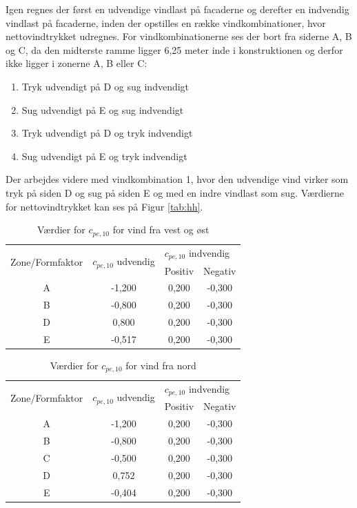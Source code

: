 Igen regnes der først en udvendige vindlast på facaderne og derefter en indvendig vindlast på facaderne, inden der opstilles en række vindkombinationer, hvor nettovindtrykket udregnes. For vindkombinationerne ses der bort fra siderne A, B og C, da den midterste ramme ligger 6,25 meter inde i konstruktionen og derfor ikke ligger i zonerne A, B eller C:
\begin{enumerate}
	\item Tryk udvendigt på D og sug indvendigt
	\item Sug udvendigt på E og sug indvendigt
	\item Tryk udvendigt på D og tryk indvendigt  
	\item Sug udvendigt på E og tryk indvendigt
\end{enumerate}

Der arbejdes videre med vindkombination 1, hvor den udvendige vind virker som tryk på siden D og sug på siden E og med en indre vindlast som sug.
\newline \indent{     }  Værdierne for nettovindtrykket kan ses på Figur \ref{tab:hh}.

\begin{table}[htb]
	\begin{center}
		\begin{tabular}{ |c|c|c|c| } 
			\hline
			\multirow{2}{*}{Zone/Formfaktor} & \multirow{2}{*}{$c_{pe,10}$ udvendig} & \multicolumn{2}{l|}{$c_{pe,10}$ indvendig} \\ \cline{3-4} 
			& & Positiv & Negativ   		\\ \hline
			A & -1,200 & 0,200 & -0,300 \\	\hline
			B & -0,800 & 0,200 & -0,300 \\	\hline 
			D & 0,800 & 0,200 & -0,300 \\	\hline
			E & -0,517 & 0,200 & -0,300 \\	\hline
		\end{tabular}
		\caption{Værdier for $c_{pe,10}$ for vind fra vest og øst}
		\label{tab:ff}
	\end{center}
\end{table}

\begin{table}[htb]
	\begin{center}
		\begin{tabular}{ |c|c|c|c| } 
			\hline
			\multirow{2}{*}{Zone/Formfaktor} & \multirow{2}{*}{$c_{pe,10}$ udvendig} & \multicolumn{2}{l|}{$c_{pe,10}$ indvendig} \\ \cline{3-4} 
			& & Positiv & Negativ   		\\ \hline
			A & -1,200 & 0,200 & -0,300 \\	\hline
			B & -0,800 & 0,200 & -0,300 \\	\hline
			C & -0,500 & 0,200 & -0,300 \\	\hline 
			D & 0,752 & 0,200 & -0,300 \\	\hline
			E & -0,404 & 0,200 & -0,300 \\	\hline
		\end{tabular}
		\caption{Værdier for $c_{pe,10}$ for vind fra nord}
		\label{tab:gg}
	\end{center}
\end{table}

